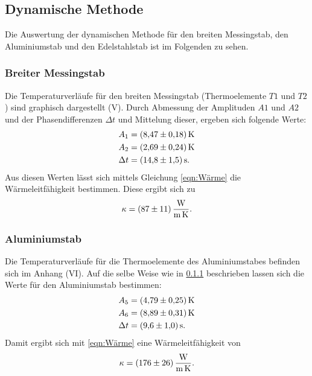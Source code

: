 \subsection{Dynamische Methode}
Die Auswertung der dynamischen Methode für den breiten Messingstab, 
den Aluminiumstab und den Edelstahlstab ist im Folgenden zu sehen.
\subsubsection{Breiter Messingstab}
\label{sec:messing}
Die Temperaturverläufe für den breiten Messingstab (Thermoelemente $T1$ und $T2$)
sind graphisch dargestellt (V).
\newline
Durch Abmessung der Amplituden $A1$ und $A2$ und der Phasendifferenzen $\Delta t$ 
und Mittelung dieser, ergeben sich folgende Werte:
\begin{align*}
    A_{1} &= \SI{8.47 \pm 0.18}{\kelvin} \\
    A_{2} &= \SI{2.69 \pm 0.24}{\kelvin} \\
    \Delta t &= \SI{14.8 \pm 1.5}{\second}.
\end{align*}
Aus diesen Werten lässt sich mittels Gleichung \eqref{eqn:Wärme} die Wärmeleitfähigkeit
bestimmen. Diese ergibt sich zu
\begin{equation*}
    \kappa = \SI{87 \pm 11}{\watt\per\meter\per\kelvin}.
\end{equation*}

\subsubsection{Aluminiumstab}
Die Temperaturverläufe für die Thermoelemente des Aluminiumstabes befinden sich im Anhang (VI).
Auf die selbe Weise wie in \ref{sec:messing} beschrieben lassen sich die Werte
für den Aluminiumstab bestimmen:
\begin{align*}
    A_{5} &= \SI{4.79 \pm 0.25}{\kelvin} \\
    A_{6} &= \SI{8.89 \pm 0.31}{\kelvin} \\
    \Delta t &= \SI{9.6 \pm 1.0}{\second}.
\end{align*}
Damit ergibt sich mit \eqref{eqn:Wärme} eine Wärmeleitfähigkeit von
\begin{equation*}
    \kappa = \SI{176 \pm 26}{\watt\per\meter\per\kelvin}.
\end{equation*}

